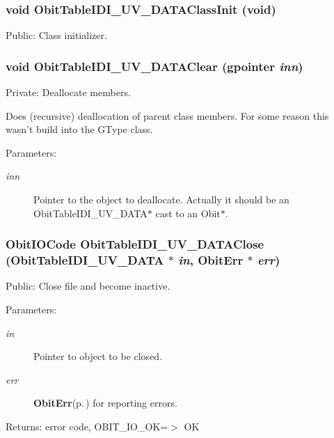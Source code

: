 \subsubsection{\setlength{\rightskip}{0pt plus 5cm}void Obit\-Table\-IDI\_\-UV\_\-DATAClass\-Init (void)}\label{ObitTableIDI__UV__DATA_8c_a27}


Public: Class initializer. 

\subsubsection{\setlength{\rightskip}{0pt plus 5cm}void Obit\-Table\-IDI\_\-UV\_\-DATAClear (gpointer {\em inn})}\label{ObitTableIDI__UV__DATA_8c_a9}


Private: Deallocate members. 

Does (recursive) deallocation of parent class members. For some reason this wasn't build into the GType class. \begin{Desc}
\item[Parameters:]
\begin{description}
\item[{\em inn}]Pointer to the object to deallocate. Actually it should be an Obit\-Table\-IDI\_\-UV\_\-DATA$\ast$ cast to an Obit$\ast$. \end{description}
\end{Desc}
\subsubsection{\setlength{\rightskip}{0pt plus 5cm}Obit\-IOCode Obit\-Table\-IDI\_\-UV\_\-DATAClose ({\bf Obit\-Table\-IDI\_\-UV\_\-DATA} $\ast$ {\em in}, {\bf Obit\-Err} $\ast$ {\em err})}\label{ObitTableIDI__UV__DATA_8c_a25}


Public: Close file and become inactive. 

\begin{Desc}
\item[Parameters:]
\begin{description}
\item[{\em in}]Pointer to object to be closed. \item[{\em err}]{\bf Obit\-Err}{\rm (p.\,\pageref{structObitErr})} for reporting errors. \end{description}
\end{Desc}
\begin{Desc}
\item[Returns:]error code, OBIT\_\-IO\_\-OK=$>$ OK \end{Desc}
